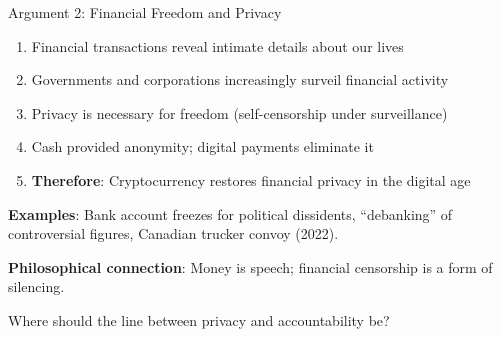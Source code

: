 ﻿\documentclass[aspectratio=169,11pt]{beamer}
\begin{document}
\begin{frame}{Argument 2: Financial Freedom and Privacy}
\begin{probox}
\begin{enumerate}
    \item Financial transactions reveal intimate details about our lives
    \item Governments and corporations increasingly surveil financial activity
    \item Privacy is necessary for freedom (self-censorship under surveillance)
    \item Cash provided anonymity; digital payments eliminate it
    \item \textbf{Therefore}: Cryptocurrency restores financial privacy in the digital age
\end{enumerate}
\end{probox}

\vspace{0.3em}
\textbf{Examples}: Bank account freezes for political dissidents, ``debanking'' of controversial figures, Canadian trucker convoy (2022).

\textbf{Philosophical connection}: Money is speech; financial censorship is a form of silencing.

\begin{discussionbox}[Discussion]
Where should the line between privacy and accountability be?
\end{discussionbox}
\end{frame}
\end{document}
